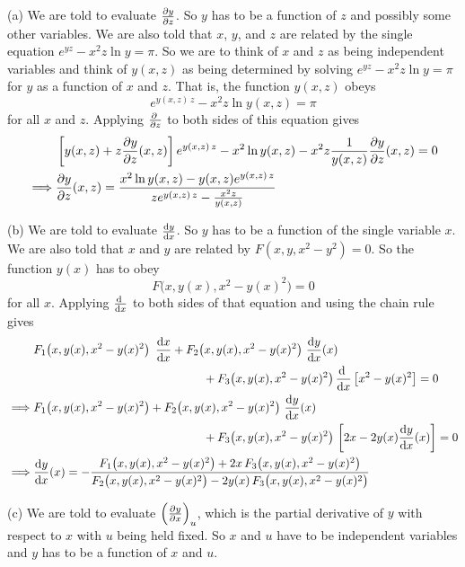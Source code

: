 \begin{solution}
(a)
We are told to evaluate $\pdiff{y}{z}$. So $y$ has to be a function of $z$
and possibly some other variables.
We are also told that $x$, $y$, and $z$ are related by the single equation
$e^{yz}-x^2 z \ln y = \pi$.
So we are to think of $x$ and $z$ as being independent variables and think of 
$y(x,z)$ as being determined by solving $e^{yz}-x^2 z \ln y = \pi$ for $y$ as a function of $x$ and $z$. That is, the function $y(x,z)$ obeys
\begin{equation*}
e^{y(x,z)\,z}-x^2 z \ln y(x,z) = \pi
\end{equation*}
for all $x$ and $z$.
Applying 
$\pdiff{}{z}$ to both sides of this equation gives
\begin{align*}
&\left[y(x,z)+z\pdiff{y}{z}(x,z)\right]e^{y(x,z)\,z}-x^2 \ln y(x,z)
-x^2 z\frac{1}{y(x,z)}\pdiff{y}{z}(x,z) = 0\\
\implies & \pdiff{y}{z}(x,z)
=\frac{x^2 \ln y(x,z)-y(x,z)e^{y(x,z)\,z}}{ze^{y(x,z)\,z}-\frac{x^2 z}{y(x,z)}}
\end{align*}

(b) 
We are told to evaluate $\diff{y}{x}$. So $y$ has to be a function of the single variable $x$. We are also told that $x$ and $y$ are related by $F(x,y,x^2-y^2)=0$. So the function $y(x)$ has to obey 
\begin{equation*}
F\big(x,y(x),x^2-y(x)^2\big)=0
\end{equation*}
for all $x$. Applying 
$\diff{}{x}$ to both sides of that equation and using the chain rule gives
\begin{align*}
&F_1\big(x,y(x),x^2-y(x)^2\big)\,\ \diff{x}{x} 
+F_2\big(x,y(x),x^2-y(x)^2\big)\ \diff{y}{x}(x)
\\&\hskip2in
+F_3\big(x,y(x),x^2-y(x)^2\big)\,\diff{}{x}\left[x^2-y(x)^2\right]= 0
\\
\implies &F_1\big(x,y(x),x^2-y(x)^2\big) +F_2\big(x,y(x),x^2-y(x)^2\big)\ \diff{y}{x}(x)
\\&\hskip2in
+F_3\big(x,y(x),x^2-y(x)^2\big)\,\left[2x-2y(x)\diff{y}{x}(x)\right]= 0
\\
\implies & \diff{y}{x}(x)
=-\frac{F_1\big(x,y(x),x^2-y(x)^2\big)+2x\,F_3\big(x,y(x),x^2-y(x)^2\big)}
{F_2\big(x,y(x),x^2-y(x)^2\big)-2y(x)\,F_3\big(x,y(x),x^2-y(x)^2\big)}
\end{align*}

(c) 
We are told to evaluate $\left(\pdiff{y}{x}\right)_u$, which is the partial
derivative of $y$ with respect to $x$ with $u$ being held fixed.
So $x$ and $u$ have to be independent variables and $y$ has to be a function of
$x$ and $u$.


\end{solution}
